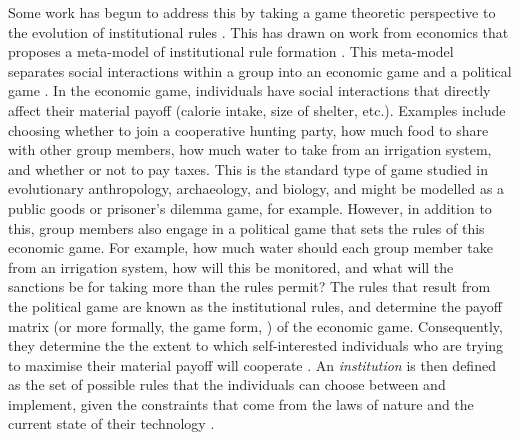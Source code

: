 \documentclass{rstb}
\begin{document}
\begin{linenumbers}
Some work has begun to address this by taking a game theoretic perspective to the evolution of institutional rules \cite{Powers:2013:a,Currie:2021:a,Gavrilets:2022:a}. This has drawn on work from economics that proposes a meta-model of institutional rule formation \cite{Hurwicz:1996:a,Reiter:1996:a}. This meta-model separates social interactions within a group into an economic game and a political game \cite{Powers:2016:a}. In the economic game, individuals have social interactions that directly affect their material payoff (calorie intake, size of shelter, etc.). Examples include choosing whether to join a cooperative hunting party, how much food to share with other group members, how much water to take from an irrigation system, and whether or not to pay taxes. This is the standard type of game studied in evolutionary anthropology, archaeology, and biology, and might be modelled as a public goods or prisoner's dilemma game, for example. However, in addition to this, group members also engage in a political game that sets the rules of this economic game. For example, how much water should each group member take from an irrigation system, how will this be monitored, and what will the sanctions be for taking more than the rules permit? The rules that result from the political game are known as the institutional rules, and determine the payoff matrix (or more formally, the game form, \cite{Hurwicz:1996:a}) of the economic game. Consequently, they determine the the extent to which self-interested individuals who are trying to maximise their material payoff will cooperate \cite{Greif:2006:a,Powers:2021:a}. An \emph{institution} is then defined as the set of possible rules that the individuals can choose between and implement, given the constraints that come from the laws of nature and the current state of their technology \cite{Hurwicz:1996:a}.


\end{linenumbers}
\end{document}
